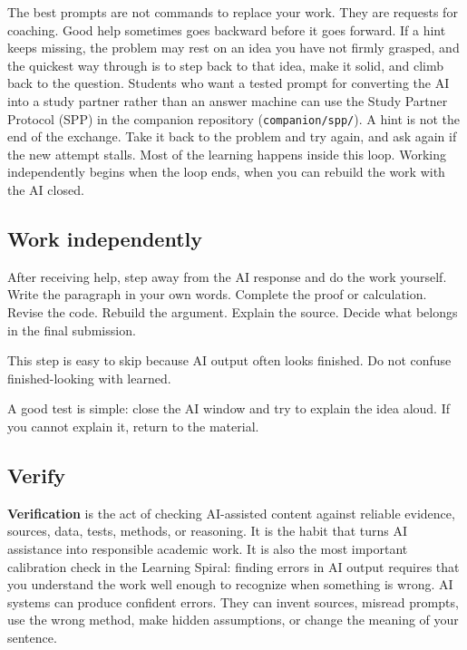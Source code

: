 \documentclass{SIAMbook2023}
\newcommand{\keyterm}[2][\relax]{%
  \textbf{#2}%
  \ifx\relax#1\index{#2|textbf}\else\index{#1|textbf}\fi}
\begin{document}
The best prompts are not commands to replace your work. They are requests for coaching. Good help sometimes goes backward before it goes forward. If a hint keeps missing, the problem may rest on an idea you have not firmly grasped, and the quickest way through is to step back to that idea, make it solid, and climb back to the question. Students who want a tested prompt for converting the AI into a study partner rather than an answer machine can use the Study Partner Protocol (SPP) in the companion repository (\texttt{companion/spp/}). A hint is not the end of the exchange. Take it back to the problem and try again, and ask again if the new attempt stalls. Most of the learning happens inside this loop. Working independently begins when the loop ends, when you can rebuild the work with the AI closed.

\subsection{Work independently}
\label{subsec:work-independently}%

After receiving help, step away from the AI response and do the work yourself. Write the paragraph in your own words. Complete the proof or calculation. Revise the code. Rebuild the argument. Explain the source. Decide what belongs in the final submission.

This step is easy to skip because AI output often looks finished. Do not confuse finished-looking with learned.

A good test is simple: close the AI window and try to explain the idea aloud. If you cannot explain it, return to the material.

\subsection{Verify}
\label{subsec:verify}%

\keyterm{Verification} is the act of checking AI-assisted content against reliable evidence, sources, data, tests, methods, or reasoning. It is the habit that turns AI assistance into responsible academic work. It is also the most important calibration check in the Learning Spiral: finding errors in AI output requires that you understand the work well enough to recognize when something is wrong. AI systems can produce confident errors. They can invent sources, misread prompts, use the wrong method, make hidden assumptions, or change the meaning of your sentence.
\end{document}
